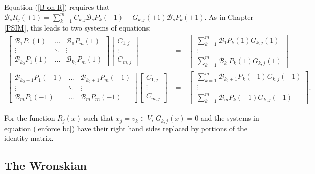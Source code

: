\documentclass{book}
\begin{document}
Equation (\ref{B on R}) requires that $\mathcal{B}_s R_j(\pm 1) = \sum_{k=1}^m C_{k,j} \mathcal{B}_s P_k (\pm1) + G_{k,j} (\pm1) \mathcal{B}_s P_k(\pm1)$.
As in Chapter \ref{PSIM}, this leads to two systems of equations:
\begin{equation} \label{enforce bc}
\begin{aligned}
\begin{bmatrix} \mathcal{B}_1 P_1(1) & \dots &  \mathcal{B}_1 P_m(1) \\ \vdots & \ddots & \vdots \\  \mathcal{B}_{k_0} P_1(1) & \dots &  \mathcal{B}_{k_0} P_m(1)  \end{bmatrix}
\begin{bmatrix} C_{1,j} \\ \vdots \\ C_{m,j} \end{bmatrix}
& = - \begin{bmatrix} \sum_{k=1}^m \mathcal{B}_1 P_k(1) G_{k,j}(1) \\ \vdots \\ \sum_{k=1}^m \mathcal{B}_{k_0} P_k(1) G_{k,j}(1) \end{bmatrix} \\
\begin{bmatrix} \mathcal{B}_{k_0 + 1} P_1(-1) & \dots &  \mathcal{B}_{k_0+1} P_m(-1) \\ \vdots & \ddots & \vdots \\  \mathcal{B}_m P_1(-1) & \dots &  \mathcal{B}_m P_m(-1)  \end{bmatrix}
\begin{bmatrix} C_{1,j} \\ \vdots \\ C_{m,j} \end{bmatrix}
& = - \begin{bmatrix} \sum_{k=1}^m \mathcal{B}_{k_0+1} P_k(-1) G_{k,j}(-1) \\ \vdots \\ \sum_{k=1}^m \mathcal{B}_m P_k(-1) G_{k,j}(-1) \end{bmatrix} .
\end{aligned}
\end{equation}

For the function $R_j(x)$ such that $x_j = v_k \in V$, $G_{k,j}(x) = 0$ and the systems in equation (\ref{enforce bc}) have their right hand sides replaced by portions of the identity matrix.

\subsection{The Wronskian}
\end{document}
